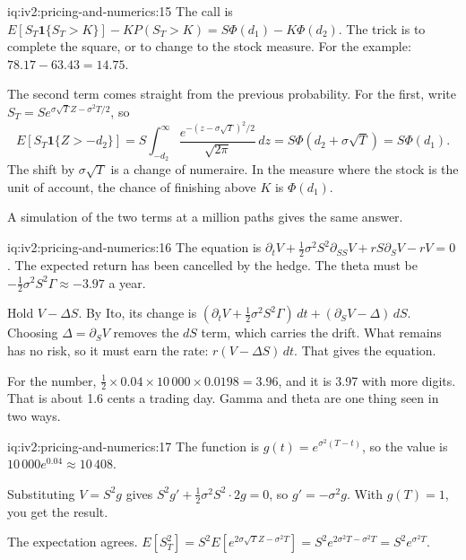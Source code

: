 \begin{solution}{iq:iv2:pricing-and-numerics:15}
The call is $E[S_T\mathbf 1\{S_T > K\}] - KP(S_T > K) = S\Phi(d_1) - K\Phi(d_2)$. The trick is to complete the square, or to change to the stock measure. For the example: $78.17 - 63.43 = 14.75$.

The second term comes straight from the previous probability. For the first, write $S_T = Se^{\sigma\sqrt T Z - \sigma^2T/2}$, so
\[
E[S_T\mathbf 1\{Z > -d_2\}] = S\int_{-d_2}^\infty \frac{e^{-(z - \sigma\sqrt T)^2/2}}{\sqrt{2\pi}}\,dz = S\Phi(d_2 + \sigma\sqrt T) = S\Phi(d_1).
\]
The shift by $\sigma\sqrt T$ is a change of numeraire. In the measure where the stock is the unit of account, the chance of finishing above $K$ is $\Phi(d_1)$.

A simulation of the two terms at a million paths gives the same answer.

\end{solution}

\begin{solution}{iq:iv2:pricing-and-numerics:16}
The equation is $\partial_tV + \tfrac12\sigma^2S^2\partial_{SS}V + rS\partial_SV - rV = 0$. The expected return has been cancelled by the hedge. The theta must be $-\tfrac12\sigma^2S^2\Gamma \approx -3.97$ a year.

Hold $V - \Delta S$. By Ito, its change is $(\partial_tV + \tfrac12\sigma^2S^2\Gamma)\,dt + (\partial_SV - \Delta)\,dS$. Choosing $\Delta = \partial_SV$ removes the $dS$ term, which carries the drift. What remains has no risk, so it must earn the rate: $r(V - \Delta S)\,dt$. That gives the equation.

For the number, $\tfrac12 \times 0.04 \times 10\,000 \times 0.0198 = 3.96$, and it is 3.97 with more digits. That is about 1.6 cents a trading day. Gamma and theta are one thing seen in two ways.

\end{solution}

\begin{solution}{iq:iv2:pricing-and-numerics:17}
The function is $g(t) = e^{\sigma^2(T - t)}$, so the value is $10\,000e^{0.04} \approx 10\,408$.

Substituting $V = S^2g$ gives $S^2g' + \tfrac12\sigma^2S^2 \cdot 2g = 0$, so $g' = -\sigma^2g$. With $g(T) = 1$, you get the result.

The expectation agrees. $E[S_T^2] = S^2E[e^{2\sigma\sqrt T Z - \sigma^2T}] = S^2e^{2\sigma^2T - \sigma^2T} = S^2e^{\sigma^2T}$.

\end{solution}

